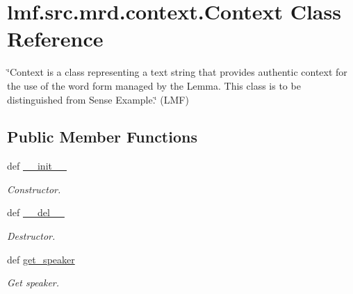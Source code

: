 \hypertarget{classlmf_1_1src_1_1mrd_1_1context_1_1_context}{\section{lmf.\+src.\+mrd.\+context.\+Context Class Reference}
\label{classlmf_1_1src_1_1mrd_1_1context_1_1_context}
}


\char`\"{}\+Context is a class representing a text string that provides authentic context for the use of the word form managed by the Lemma. This class is to be distinguished from Sense Example.\char`\"{} (L\+M\+F)  


\subsection*{Public Member Functions}
\begin{DoxyCompactItemize}
\item 
def \hyperlink{classlmf_1_1src_1_1mrd_1_1context_1_1_context_acc18b0fe7b0db9c6e64e934ee67fc6a9}{\+\_\+\+\_\+init\+\_\+\+\_\+}
\begin{DoxyCompactList}\small\item\em Constructor. \end{DoxyCompactList}\item 
def \hyperlink{classlmf_1_1src_1_1mrd_1_1context_1_1_context_a490b0011c22dc5843ba7c6b176f3b72b}{\+\_\+\+\_\+del\+\_\+\+\_\+}
\begin{DoxyCompactList}\small\item\em Destructor. \end{DoxyCompactList}\item 
def \hyperlink{classlmf_1_1src_1_1mrd_1_1context_1_1_context_a411ba47fe4581d2e3416b44fbd9ab1d9}{get\+\_\+speaker}
\begin{DoxyCompactList}\small\item\em Get speaker. \end{DoxyCompactList}\end{DoxyCompactItemize}
